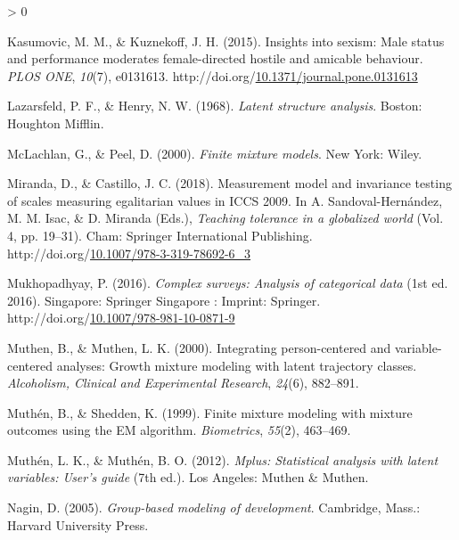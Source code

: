 \documentclass[12pt,a4paper,oneside]{reedthesis}
\newlength{\cslhangindent}
\newenvironment{CSLReferences}[2] %
 {%
  \setlength{\parindent}{0pt}
  \ifodd #1 \everypar{\setlength{\hangindent}{\cslhangindent}}\ignorespaces\fi
  \ifnum #2 > 0
  \setlength{\parskip}{#2\baselineskip}
  \fi
 }%
 {}
\begin{document}
\begin{CSLReferences}{1}{0}
\leavevmode\hypertarget{ref-kasumovic_insights_2015}{}%
Kasumovic, M. M., \& Kuznekoff, J. H. (2015). Insights into sexism: Male status and performance moderates female-directed hostile and amicable behaviour. \emph{{PLOS} {ONE}}, \emph{10}(7), e0131613. http://doi.org/\href{https://doi.org/10.1371/journal.pone.0131613}{10.1371/journal.pone.0131613}

\leavevmode\hypertarget{ref-lazarsfeld_latent_1968}{}%
Lazarsfeld, P. F., \& Henry, N. W. (1968). \emph{Latent structure analysis}. Boston: Houghton Mifflin.

\leavevmode\hypertarget{ref-mclachlan_finite_2000}{}%
McLachlan, G., \& Peel, D. (2000). \emph{Finite mixture models}. New York: Wiley.

\leavevmode\hypertarget{ref-miranda_measurement_2018}{}%
Miranda, D., \& Castillo, J. C. (2018). Measurement model and invariance testing of scales measuring egalitarian values in {ICCS} 2009. In A. Sandoval-Hernández, M. M. Isac, \& D. Miranda (Eds.), \emph{Teaching tolerance in a globalized world} (Vol. 4, pp. 19--31). Cham: Springer International Publishing. http://doi.org/\href{https://doi.org/10.1007/978-3-319-78692-6_3}{10.1007/978-3-319-78692-6\_3}

\leavevmode\hypertarget{ref-mukhopadhyay_complex_2016}{}%
Mukhopadhyay, P. (2016). \emph{Complex surveys: Analysis of categorical data} (1st ed. 2016). Singapore: Springer Singapore : Imprint: Springer. http://doi.org/\href{https://doi.org/10.1007/978-981-10-0871-9}{10.1007/978-981-10-0871-9}

\leavevmode\hypertarget{ref-muthen_integrating_2000}{}%
Muthen, B., \& Muthen, L. K. (2000). Integrating person-centered and variable-centered analyses: Growth mixture modeling with latent trajectory classes. \emph{Alcoholism, Clinical and Experimental Research}, \emph{24}(6), 882--891.

\leavevmode\hypertarget{ref-muthen_finite_1999}{}%
Muthén, B., \& Shedden, K. (1999). Finite mixture modeling with mixture outcomes using the {EM} algorithm. \emph{Biometrics}, \emph{55}(2), 463--469.

\leavevmode\hypertarget{ref-muthen_mplus_2012}{}%
Muthén, L. K., \& Muthén, B. O. (2012). \emph{Mplus: Statistical analysis with latent variables: User's guide} (7th ed.). Los Angeles: Muthen \& Muthen.

\leavevmode\hypertarget{ref-nagin_group-based_2005}{}%
Nagin, D. (2005). \emph{Group-based modeling of development}. Cambridge, Mass.: Harvard University Press.


\end{CSLReferences}
\end{document}
